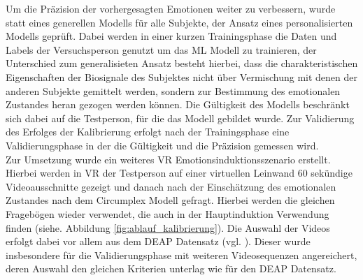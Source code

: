 Um die Präzision der vorhergesagten Emotionen weiter zu verbessern, wurde statt eines generellen Modells für alle Subjekte, der Ansatz eines personalisierten Modells geprüft. Dabei werden in einer kurzen Trainingsphase die Daten und Labels der Versuchsperson genutzt um das ML Modell zu trainieren, der Unterschied zum generalisieten Ansatz besteht hierbei, dass die charakteristischen Eigenschaften der Biosignale des Subjektes nicht über Vermischung mit denen der anderen Subjekte gemittelt werden, sondern zur Bestimmung des emotionalen Zustandes heran gezogen werden können. Die Gültigkeit des Modells beschränkt sich dabei auf die Testperson, für die das Modell gebildet wurde. Zur Validierung des Erfolges der Kalibrierung erfolgt nach der Trainingsphase eine Validierungsphase in der die Gültigkeit und die Präzision gemessen wird. \\

Zur Umsetzung wurde ein weiteres VR Emotionsinduktionsszenario erstellt. Hierbei werden in VR der Testperson auf einer virtuellen Leinwand 60 sekündige Videoausschnitte gezeigt und danach nach der Einschätzung des emotionalen Zustandes nach dem Circumplex Modell gefragt. Hierbei werden die gleichen Fragebögen wieder verwendet, die auch in der Hauptinduktion Verwendung finden (siehe. Abbildung \ref{fig:ablauf_kalibrierung}). Die Auswahl der Videos erfolgt dabei vor allem aus dem DEAP Datensatz (vgl. \cite{}). Dieser wurde insbesondere für die Validierungsphase mit weiteren Videosequenzen angereichert, deren Auswahl den gleichen Kriterien unterlag wie für den DEAP Datensatz. \\

